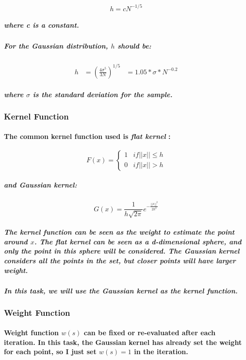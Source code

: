 \documentclass{article}
\begin{document}
\begin{equation}
    h = cN^{-1/5}
\end{equation}
\subparagraph{
    where c is a constant.
}
\subparagraph{
    For the Gaussian distribution, $h$ should be:
}

\begin{equation}
\begin{aligned}
    h &= (\frac{4\sigma^5}{3N})^{1/5}
&=1.05 * \sigma * N^{-0.2}
\end{aligned}
\end{equation}
\subparagraph{where $\sigma$ is the standard deviation for the sample.}

\subsubsection{Kernel Function}
\paragraph{
    The common kernel function used is \textit{flat kernel} :
}

\begin{equation}
    F(x) =
    \begin{cases}
        1 &if ||x|| \le h\\
        0 &if ||x|| > h
        \end{cases}
\end{equation}
\subparagraph{and \textit{Gaussian kernel}:}

\begin{equation}
    G(x) = \frac{1}{h\sqrt{2\pi}} e^{-\frac{||x||^2}{2h^2}}
\end{equation}

\subparagraph{
    The kernel function can be seen as the weight to estimate the point around $x$.
    The \textit{flat kernel} can be seen as a d-dimensional sphere, and only the point in this sphere will be considered.
    The \textit{Gaussian kernel} considers all the points in the set, but closer points will have larger weight.
}
\subparagraph{
    In this task, we will use the \textit{Gaussian kernel} as the kernel function.
}

\subsubsection{Weight Function}
\paragraph{
    Weight function $w(s)$ can be fixed or re-evaluated after each iteration. In this task, the Gaussian kernel has already
    set the weight for each point, so I just set $w(s) = 1$ in the iteration.
}
\end{document}
